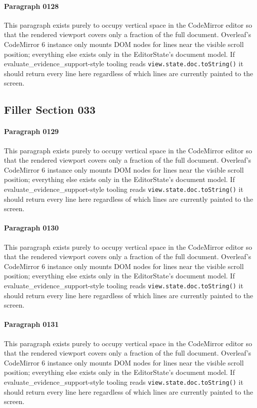 \documentclass{article}
\begin{document}
\paragraph{Paragraph 0128}
This paragraph exists purely to occupy vertical space in the CodeMirror editor so that the rendered viewport covers only a fraction of the full document. Overleaf's CodeMirror 6 instance only mounts DOM nodes for lines near the visible scroll position; everything else exists only in the EditorState's document model. If evaluate\_evidence\_support-style tooling reads \texttt{view.state.doc.toString()} it should return every line here regardless of which lines are currently painted to the screen.

\subsection{Filler Section 033}
\paragraph{Paragraph 0129}
This paragraph exists purely to occupy vertical space in the CodeMirror editor so that the rendered viewport covers only a fraction of the full document. Overleaf's CodeMirror 6 instance only mounts DOM nodes for lines near the visible scroll position; everything else exists only in the EditorState's document model. If evaluate\_evidence\_support-style tooling reads \texttt{view.state.doc.toString()} it should return every line here regardless of which lines are currently painted to the screen.

\paragraph{Paragraph 0130}
This paragraph exists purely to occupy vertical space in the CodeMirror editor so that the rendered viewport covers only a fraction of the full document. Overleaf's CodeMirror 6 instance only mounts DOM nodes for lines near the visible scroll position; everything else exists only in the EditorState's document model. If evaluate\_evidence\_support-style tooling reads \texttt{view.state.doc.toString()} it should return every line here regardless of which lines are currently painted to the screen.

\paragraph{Paragraph 0131}
This paragraph exists purely to occupy vertical space in the CodeMirror editor so that the rendered viewport covers only a fraction of the full document. Overleaf's CodeMirror 6 instance only mounts DOM nodes for lines near the visible scroll position; everything else exists only in the EditorState's document model. If evaluate\_evidence\_support-style tooling reads \texttt{view.state.doc.toString()} it should return every line here regardless of which lines are currently painted to the screen.
\end{document}
